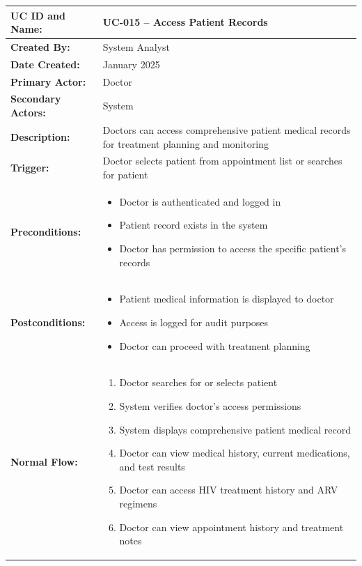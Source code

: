 \documentclass[12pt,a4paper]{article}
\begin{document}
\renewcommand{\arraystretch}{1.5}
\begin{longtable}{|p{4.5cm}|p{10.5cm}|}
\hline
\textbf{UC ID and Name:} & UC-015 – Access Patient Records \\
\hline
\textbf{Created By:} & System Analyst \\
\hline
\textbf{Date Created:} & January 2025 \\
\hline
\textbf{Primary Actor:} & Doctor \\
\hline
\textbf{Secondary Actors:} & System \\
\hline
\textbf{Description:} & Doctors can access comprehensive patient medical records for treatment planning and monitoring \\
\hline
\textbf{Trigger:} & Doctor selects patient from appointment list or searches for patient \\
\hline
\textbf{Preconditions:} &
\begin{itemize}
  \item Doctor is authenticated and logged in
  \item Patient record exists in the system
  \item Doctor has permission to access the specific patient's records
\end{itemize} \\
\hline
\textbf{Postconditions:} &
\begin{itemize}
  \item Patient medical information is displayed to doctor
  \item Access is logged for audit purposes
  \item Doctor can proceed with treatment planning
\end{itemize} \\
\hline
\textbf{Normal Flow:} &
\begin{enumerate}
  \item Doctor searches for or selects patient
  \item System verifies doctor's access permissions
  \item System displays comprehensive patient medical record
  \item Doctor can view medical history, current medications, and test results
  \item Doctor can access HIV treatment history and ARV regimens
  \item Doctor can view appointment history and treatment notes
\end{enumerate} \\

\end{longtable}
\end{document}
